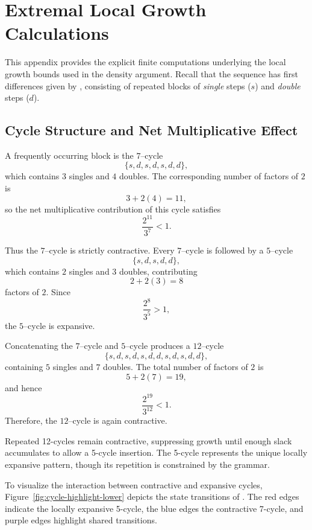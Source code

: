 \documentclass[12pt, oneside]{article}   	%
\numberwithin{equation}{section}          %
\theoremstyle{definition}
\begin{document}
\newpage
\section{Extremal Local Growth Calculations}
\label{app:local-growth-details}

This appendix provides the explicit finite computations underlying the local
growth bounds used in the density argument. Recall that the sequence 
has first differences given by , consisting of repeated blocks of
\emph{single} steps ($s$) and \emph{double} steps ($d$).

\subsection{Cycle Structure and Net Multiplicative Effect}

A frequently occurring block is the $7$--cycle
\[
\{ s, d, s, d, s, d, d \},
\]
which contains $3$ singles and $4$ doubles.  The corresponding number of
factors of $2$ is
\[
3 + 2(4) = 11,
\]
so the net multiplicative contribution of this cycle satisfies
\[
\frac{2^{11}}{3^7} < 1.
\]

Thus the $7$--cycle is strictly contractive. Every $7$--cycle is followed by a $5$--cycle
\[
\{ s, d, s, d, d \},
\]
which contains $2$ singles and $3$ doubles, contributing
\[
2 + 2(3) = 8
\]
factors of $2$.  Since
\[
\frac{2^8}{3^5} > 1,
\]
the $5$--cycle is expansive.

Concatenating the $7$--cycle and $5$--cycle produces a $12$--cycle
\[
\{ s, d, s, d, s, d, d, s, d, s, d, d \},
\]
containing $5$ singles and $7$ doubles.  The total number of factors of $2$ is
\[
5 + 2(7) = 19,
\]
and hence
\[
\frac{2^{19}}{3^{12}} < 1.
\]
Therefore, the $12$--cycle is again contractive.

Repeated 12-cycles remain contractive, suppressing growth until enough
slack accumulates to allow a 5-cycle insertion. The 5-cycle represents the
unique locally expansive pattern, though its repetition is constrained by
the grammar.

To visualize the interaction between contractive and expansive cycles,
Figure~\ref{fig:cycle-highlight-lower} depicts the state transitions of
. The red edges indicate the locally expansive 5-cycle, the
blue edges the contractive 7-cycle, and purple edges highlight shared transitions.
\end{document}
